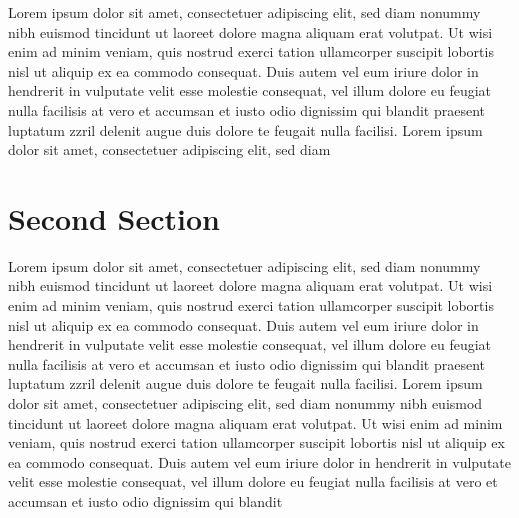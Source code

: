 Lorem ipsum dolor sit amet, consectetuer adipiscing elit, sed diam nonummy nibh euismod tincidunt ut laoreet dolore magna aliquam erat volutpat. Ut wisi enim ad minim veniam, quis nostrud exerci tation ullamcorper suscipit lobortis nisl ut aliquip ex ea commodo consequat. Duis autem vel eum iriure dolor in hendrerit in vulputate velit esse molestie consequat, vel illum dolore eu feugiat nulla facilisis at vero et accumsan et iusto odio dignissim qui blandit praesent luptatum zzril delenit augue duis dolore te feugait nulla facilisi. Lorem ipsum dolor sit amet, consectetuer adipiscing elit, sed diam 

\section{Second Section}

Lorem ipsum dolor sit amet, consectetuer adipiscing elit, sed diam nonummy nibh euismod tincidunt ut laoreet dolore magna aliquam erat volutpat. Ut wisi enim ad minim veniam, quis nostrud exerci tation ullamcorper suscipit lobortis nisl ut aliquip ex ea commodo consequat. Duis autem vel eum iriure dolor in hendrerit in vulputate velit esse molestie consequat, vel illum dolore eu feugiat nulla facilisis at vero et accumsan et iusto odio dignissim qui blandit praesent luptatum zzril delenit augue duis dolore te feugait nulla facilisi. Lorem ipsum dolor sit amet, consectetuer adipiscing elit, sed diam nonummy nibh euismod tincidunt ut laoreet dolore magna aliquam erat volutpat. Ut wisi enim ad minim veniam, quis nostrud exerci tation ullamcorper suscipit lobortis nisl ut aliquip ex ea commodo consequat. Duis autem vel eum iriure dolor in hendrerit in vulputate velit esse molestie consequat, vel illum dolore eu feugiat nulla facilisis at vero et accumsan et iusto odio dignissim qui blandit
